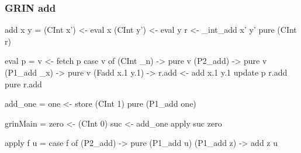 \documentclass[bigger]{beamer}
\begin{document}
\begin{frame}[fragile]
\frametitle{GRIN add}
\begin{center}

	\begin{minipage}{0.45\textwidth}
		\vspace{0.7cm}
		\begin{haskellcode}
			add x y =
			 (CInt x') <- eval x
			 (CInt y') <- eval y
			 r <- _int_add x' y'
			 pure (CInt r)
		\end{haskellcode}
		\begin{haskellcode}
			eval p =
			 v <- fetch p
			 case v of
			  (CInt _n) -> pure v
			  (P2_add) -> pure v
			  (P1_add _x) -> pure v
			  (Fadd x.1 y.1) ->
			   r.add <- add x.1 y.1
			   update p r.add
			   pure r.add
		\end{haskellcode}
	\end{minipage}
	\hfill
	\begin{minipage}{0.50\textwidth}
		\begin{haskellcode}
			add_one =
			 one <- store (CInt 1)
			 pure (P1_add one)
		\end{haskellcode}
		\vfill
		\begin{haskellcode}
			grinMain =
			 zero <- (CInt 0)
			 suc <- add_one
			 apply suc zero
		\end{haskellcode}
		\vfill
		\begin{haskellcode}
			apply f u =
			 case f of
			  (P2_add) ->
			   pure (P1_add u)
			  (P1_add z) -> add z u
		\end{haskellcode}
	\end{minipage}

\end{center}
\end{frame}
\end{document}
